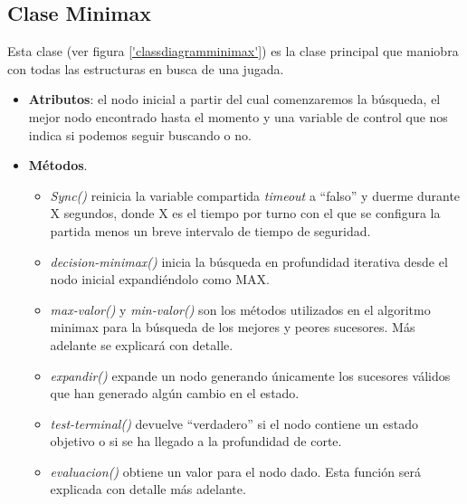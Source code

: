
\subsection {Clase Minimax}
Esta clase (ver figura \ref{'classdiagramminimax'}) es la clase
principal que maniobra con todas las estructuras en busca de una
jugada.
\begin{itemize}
\item \textbf{Atributos}: el nodo inicial a partir del cual
  comenzaremos la búsqueda, el mejor nodo encontrado hasta el momento
  y una variable de control que nos indica si podemos seguir buscando
  o no.
\item \textbf{Métodos}.
  \begin{itemize}
  \item \emph{Sync()} reinicia la variable compartida \emph{timeout} a
    ``falso'' y duerme durante X segundos, donde X es el tiempo por
    turno con el que se configura la partida menos un breve intervalo
    de tiempo de seguridad.
  \item \emph{decision-minimax()} inicia la búsqueda en profundidad
    iterativa desde el nodo inicial expandiéndolo como MAX.
  \item \emph{max-valor()} y \emph{min-valor()} son los métodos
    utilizados en el algoritmo minimax para la búsqueda de los mejores
    y peores sucesores. Más adelante se explicará con detalle.
  \item \emph{expandir()} expande un nodo generando únicamente los
    sucesores válidos que han generado algún cambio en el estado.
  \item \emph{test-terminal()} devuelve ``verdadero'' si el nodo
    contiene un estado objetivo o si se ha llegado a la profundidad de corte.
  \item \emph{evaluacion()} obtiene un valor para el nodo dado. Esta
    función será explicada con detalle más adelante.
  \end{itemize}
\end{itemize}


